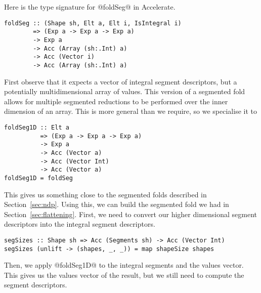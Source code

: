 Here is the type signature for @foldSeg@ in Accelerate.
%
\begin{lstlisting}
foldSeg :: (Shape sh, Elt a, Elt i, IsIntegral i)
        => (Exp a -> Exp a -> Exp a)
        -> Exp a
        -> Acc (Array (sh:.Int) a)
        -> Acc (Vector i)
        -> Acc (Array (sh:.Int) a)
\end{lstlisting}
%
First observe that it expects a vector of integral segment descriptors, but a potentially multidimensional array of values. This version of a segmented fold allows for multiple segmented reductions to be performed over the inner dimension of an array. This is more general than we require, so we specialise it to
%
\begin{lstlisting}
foldSeg1D :: Elt a
          => (Exp a -> Exp a -> Exp a)
          -> Exp a
          -> Acc (Vector a)
          -> Acc (Vector Int)
          -> Acc (Vector a)
foldSeg1D = foldSeg
\end{lstlisting}
%
This gives us something close to the segmented folds described in Section~\ref{sec:ndp}. Using this, we can build the segmented fold we had in Section~\ref{sec:flattening}. First, we need to convert our higher dimensional segment descriptors into the integral segment descriptors.
%
\begin{lstlisting}
segSizes :: Shape sh => Acc (Segments sh) -> Acc (Vector Int)
segSizes (unlift -> (shapes, _, _)) = map shapeSize shapes
\end{lstlisting}
%
Then, we apply @foldSeg1D@ to the integral segments and the values vector. This gives us the values vector of the result, but we still need to compute the segment descriptors.


